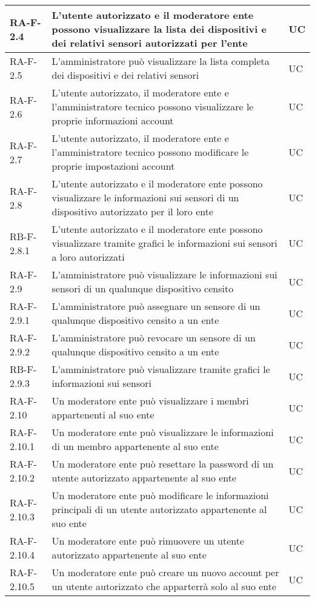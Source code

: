 \begin{center}
\begin{longtable}{|p{3cm}|p{9.85cm}|p{2cm}|}
		{\color{gray} RA-F-}2.4 & L'utente autorizzato e il moderatore ente possono visualizzare la lista dei dispositivi e dei relativi sensori autorizzati per l'ente & UC \\ \hline
		{\color{gray} RA-F-}2.5 & L'amministratore può visualizzare la lista completa dei dispositivi e dei relativi sensori & UC \\ \hline

		{\color{gray} RA-F-}2.6 & L'utente autorizzato, il moderatore ente e l'amministratore tecnico possono visualizzare le proprie informazioni account & UC \\ \hline
		{\color{gray} RA-F-}2.7 & L'utente autorizzato, il moderatore ente e l'amministratore tecnico possono modificare le proprie impostazioni account & UC \\ \hline
		
		{\color{gray} RA-F-}2.8 & L'utente autorizzato e il moderatore ente possono visualizzare le informazioni sui sensori di un dispositivo autorizzato per il loro ente & UC \\ \hline
		{\color{gray} RB-F-}2.8.1 & L'utente autorizzato e il moderatore ente possono visualizzare tramite grafici le informazioni sui sensori a loro autorizzati & UC \\ \hline
		{\color{gray} RA-F-}2.9 & L'amministratore può visualizzare le informazioni sui sensori di un qualunque dispositivo censito & UC \\ \hline
		{\color{gray} RA-F-}2.9.1 & L'amministratore può assegnare un sensore di un qualunque dispositivo censito a un ente & UC \\ \hline
		{\color{gray} RA-F-}2.9.2 & L'amministratore può revocare un sensore di un qualunque dispositivo censito a un ente & UC \\ \hline
		{\color{gray} RB-F-}2.9.3 & L'amministratore può visualizzare tramite grafici le informazioni sui sensori & UC \\ \hline

		{\color{gray} RA-F-}2.10 & Un moderatore ente può visualizzare i membri appartenenti al suo ente & UC \\ \hline
		{\color{gray} RA-F-}2.10.1 & Un moderatore ente può visualizzare le informazioni di un membro appartenente al suo ente & UC \\ \hline
		{\color{gray} RA-F-}2.10.2 & Un moderatore ente può resettare la password di un utente autorizzato appartenente al suo ente & UC \\ \hline
		{\color{gray} RA-F-}2.10.3 & Un moderatore ente può modificare le informazioni principali di un utente autorizzato appartenente al suo ente & UC \\ \hline
		{\color{gray} RA-F-}2.10.4 & Un moderatore ente può rimuovere un utente autorizzato appartenente al suo ente & UC \\ \hline
		{\color{gray} RA-F-}2.10.5 & Un moderatore ente può creare un nuovo account per un utente autorizzato che apparterrà solo al suo ente & UC \\ \hline


\end{longtable}
\end{center}
